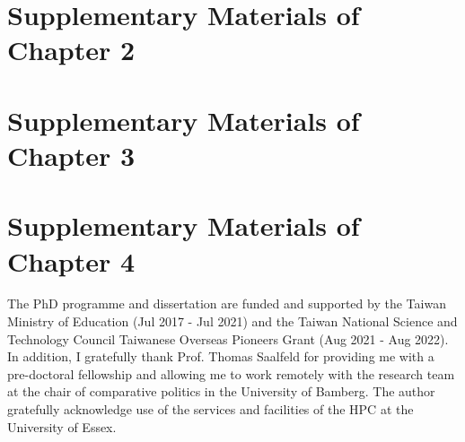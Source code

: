 \documentclass[12pt,leqno]{report}
\begin{document}
\clearpage
\chapter{Supplementary Materials of Chapter 2}
\clearpage

\chapter{Supplementary Materials of Chapter 3}
\clearpage

\chapter{Supplementary Materials of Chapter 4}
\clearpage

\begin{acknowledgments}
The PhD programme and dissertation are funded and supported by the Taiwan Ministry of Education (Jul 2017 - Jul 2021) and the Taiwan National Science and Technology Council Taiwanese Overseas Pioneers Grant (Aug 2021 - Aug 2022). In addition, I gratefully thank Prof. Thomas Saalfeld for providing me with a pre-doctoral fellowship and allowing me to work remotely with the research team at the chair of comparative politics in the University of Bamberg. The author gratefully acknowledge use of the services and facilities of the HPC at the University of Essex.


\end{acknowledgments}

\end{document}
